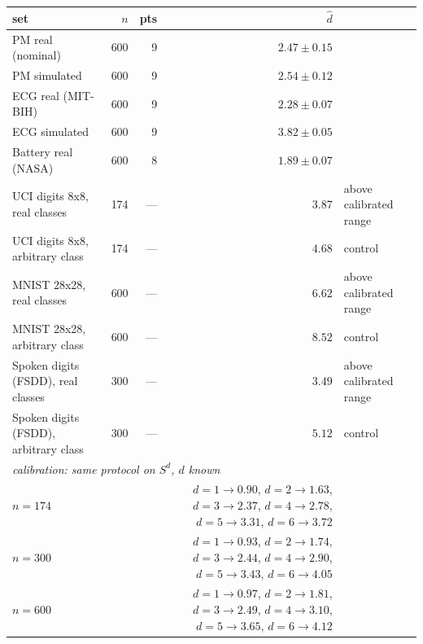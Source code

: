 \begin{tabular}{lrrrl}
\toprule
set & $n$ & pts & $\hat{d}$ & \\
\midrule
PM real (nominal) & 600 & 9 & $2.47 \pm 0.15$ &  \\
PM simulated & 600 & 9 & $2.54 \pm 0.12$ &  \\
ECG real (MIT-BIH) & 600 & 9 & $2.28 \pm 0.07$ &  \\
ECG simulated & 600 & 9 & $3.82 \pm 0.05$ &  \\
Battery real (NASA) & 600 & 8 & $1.89 \pm 0.07$ &  \\
\midrule
UCI digits 8x8, real classes & 174 & --- & $3.87$ & above calibrated range \\
UCI digits 8x8, arbitrary class & 174 & --- & $4.68$ & control \\
MNIST 28x28, real classes & 600 & --- & $6.62$ & above calibrated range \\
MNIST 28x28, arbitrary class & 600 & --- & $8.52$ & control \\
Spoken digits (FSDD), real classes & 300 & --- & $3.49$ & above calibrated range \\
Spoken digits (FSDD), arbitrary class & 300 & --- & $5.12$ & control \\
\midrule
\multicolumn{5}{l}{\emph{calibration: same protocol on $S^d$, $d$ known}} \\
$n=174$ & & & $d{=}1\!\to\!0.90$, $d{=}2\!\to\!1.63$, $d{=}3\!\to\!2.37$, $d{=}4\!\to\!2.78$, $d{=}5\!\to\!3.31$, $d{=}6\!\to\!3.72$ & \\
$n=300$ & & & $d{=}1\!\to\!0.93$, $d{=}2\!\to\!1.74$, $d{=}3\!\to\!2.44$, $d{=}4\!\to\!2.90$, $d{=}5\!\to\!3.43$, $d{=}6\!\to\!4.05$ & \\
$n=600$ & & & $d{=}1\!\to\!0.97$, $d{=}2\!\to\!1.81$, $d{=}3\!\to\!2.49$, $d{=}4\!\to\!3.10$, $d{=}5\!\to\!3.65$, $d{=}6\!\to\!4.12$ & \\
\bottomrule
\end{tabular}

